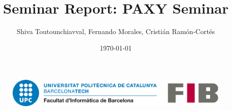 \documentclass[a4paper, 11pt]{article}
\title{Seminar Report: PAXY Seminar}
\author{Shiva Toutounchiavval, Fernando Morales, Cristián Ramón-Cortés}
\date{\today{}}
\begin{document}
  \begin{titlepage}
    \maketitle
     \begin{figure}[b!]
      \centering
      \includegraphics[width=120mm]{./images/logoFIB.png}
     \end{figure}
    \thispagestyle{empty}
  \end{titlepage}

  
  \setcounter{tocdepth}{6}
  \tableofcontents
  \listoffigures
  \listoftables
    
  \newpage

  

  
  
  
  


  \newpage 
\end{document}
